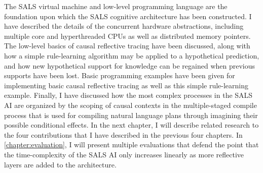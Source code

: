 The SALS virtual machine and low-level programming language are the
foundation upon which the SALS cognitive architecture has been
constructed.  I have described the details of the concurrent hardware
abstractions, including multiple core and hyperthreaded CPUs as well
as distributed memory pointers.  The low-level basics of causal
reflective tracing have been discussed, along with how a simple
rule-learning algorithm may be applied to a hypothetical prediction,
and how new hypothetical support for knowledge can be regained when
previous supports have been lost.  Basic programming examples have
been given for implementing basic causal reflective tracing as well as
this simple rule-learning example.  Finally, I have discussed how the
most complex processes in the SALS AI are organized by the scoping of
causal contexts in the multiple-staged compile process that is used
for compiling natural language plans through imagining their possible
conditional effects.  In the next chapter, I will describe related
research to the four contributions that I have described in the
previous four chapters.  In {\mbox{\autoref{chapter:evaluation}}}, I
will present multiple evaluations that defend the point that the
time-complexity of the SALS AI only increases linearly as more
reflective layers are added to the architecture.

